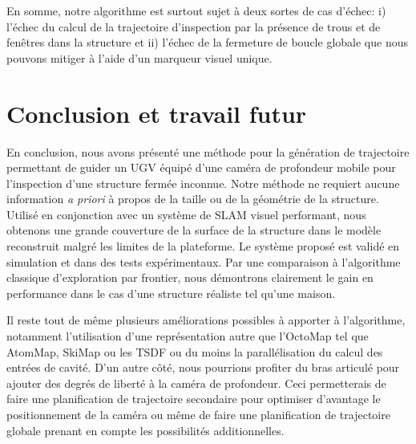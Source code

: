 En somme, notre algorithme est surtout sujet à deux sortes de cas d'échec: i) l'échec du calcul de la trajectoire d'inspection par la présence de trous et de fenêtres dans la structure et ii) l'échec de la fermeture de boucle globale que nous pouvons mitiger à l'aide d'un marqueur visuel unique.

\section{Conclusion et travail futur}

En conclusion, nous avons présenté une méthode pour la génération de trajectoire permettant de guider un UGV équipé d'une caméra de profondeur mobile pour l'inspection d'une structure fermée inconnue. Notre méthode ne requiert aucune information \textit{a priori} à propos de la taille ou de la géométrie de la structure. Utilisé en conjonction avec un système de SLAM visuel performant, nous obtenons une grande couverture de la surface de la structure dans le modèle reconstruit malgré les limites de la plateforme. Le système proposé est validé en simulation et dans des tests expérimentaux. Par une comparaison à l'algorithme classique d'exploration par frontier, nous démontrons clairement le gain en performance dans le cas d'une structure réaliste tel qu'une maison.

Il reste tout de même plusieurs améliorations possibles à apporter à l'algorithme, notamment l'utilisation d'une représentation autre que l'OctoMap tel que AtomMap, SkiMap ou les TSDF ou du moins la parallélisation du calcul des entrées de cavité. D'un autre côté, nous pourrions profiter du bras articulé pour ajouter des degrés de liberté à la caméra de profondeur. Ceci permetterais de faire une planification de trajectoire secondaire pour optimiser d'avantage le positionnement de la caméra ou même de faire une planification de trajectoire globale prenant en compte les possibilités additionnelles.
